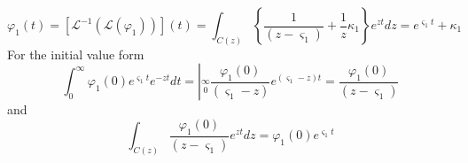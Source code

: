 \documentclass[aps,preprint]{revtex4}%
\begin{document}
\begin{equation}
\varphi_{1}\left(  t\right)  =\left[  \mathcal{L}^{-1}\left(  \mathcal{L}%
\left(  \varphi_{1}\right)  \right)  \right]  \left(  t\right)  =\int
_{C\left(  z\right)  }\left\{  \frac{1}{\left(  z-\varsigma_{1}\right)
}+\frac{1}{z}\kappa_{1}\right\}  e^{zt}dz=e^{\varsigma_{1}t}+\kappa_{1}%
\end{equation}
For the initial value form
\begin{equation}
\int_{0}^{\infty}\varphi_{1}\left(  0\right)  e^{\varsigma_{1}t}%
e^{-zt}dt=\left\vert \overset{\infty}{\underset{0}{}}\frac{\varphi_{1}\left(
0\right)  }{\left(  \varsigma_{1}-z\right)  }e^{\left(  \varsigma
_{1}-z\right)  t}\right.  =\frac{\varphi_{1}\left(  0\right)  }{\left(
z-\varsigma_{1}\right)  }%
\end{equation}
and
\begin{equation}
\int_{C\left(  z\right)  }\frac{\varphi_{1}\left(  0\right)  }{\left(
z-\varsigma_{1}\right)  }e^{zt}dz=\varphi_{1}\left(  0\right)  e^{\varsigma
_{1}t}%
\end{equation}
\end{document}
